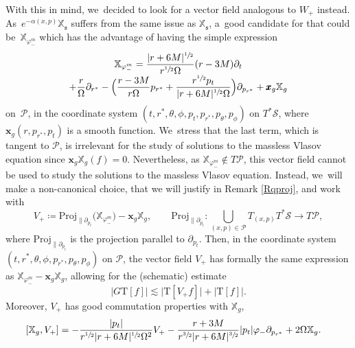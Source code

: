 \documentclass[10pt]{amsart}
\theoremstyle{plain}
\theoremstyle{definition}
\newcommand\T{{\mathbb{X}}}
\begin{document}
With this in mind, we~decided to look for a vector field analogous to $W_+$ instead. As~$e^{-\alpha (x,p)}\T_{\mathfrak{s}}$ suffers from the same issue as $\T_{\mathfrak{s}}$, a~good candidate for that could be~$\T_{\varphi_-^m}$ which has the advantage of having the simple expression\vspace*{-5pt}
\begin{multline}\label{eq:expTphi}
\T_{\varphi_-^m} = \frac{|r+6M|^{\sfrac{1}{2}}}{r^{\sfrac{1}{2}}\Omega}(r-3M) \partial_t\\[-3pt]
+\frac{r}{\Omega} \partial_{r^*}-\Bigl(\frac{r-3M}{r\Omega}p_{r^*}+\frac{r^{\sfrac{1}{2}}p_t}{|r+6M|^{\sfrac{1}{2}} \Omega} \Bigr) \partial_{p_{r^*}}+\pmb{x}_g \T_g
\end{multline}
on \,$\mathcal{P}$, in the coordinate system $(t,r^*,\theta, \phi, p_t,p_{r^*},p_\theta, p_\phi)$ on $T^* \mathcal{S}$, where $\pmb{x}_g(r,p_{r^*},p_t)$ is a smooth function. We~stress that the last term, which is tangent to $\mathcal{P}$, is irrelevant for the study of solutions to the massless Vlasov equation since $\pmb{x}_g \T_g(f)=0$. Nevertheless, as $\T_{\varphi_-^m} \notin T \mathcal{P}$, this vector field cannot be used to study the solutions to the massless Vlasov equation. Instead, we~will make a non-canonical choice, that we will justify in Remark \ref{Rqproj}, and work with\vspace*{-3pt}
\[
V_+ \coloneqq \mathrm{Proj}_{\parallel \partial_{p_t}}\bigl(\T_{\varphi_-^m} \bigr)-\pmb{x}_g \T_g,\qquad \mathrm{Proj}_{\parallel \partial_{p_t}} : \bigcup_{(x,p) \in \mathcal{P}} T_{(x,p)} T^* \mathcal{S} \to T \mathcal{P},
\]
where $\mathrm{Proj}_{\parallel \partial_{p_t}} $ is the projection parallel to $\partial_{p_t}$. Then, in the coordinate system $(t,r^*,\theta, \phi,p_{r^*},p_\theta, p_\phi)$ on $\mathcal{P}$, the vector field $V_+$ has formally the same expression as $\T_{\varphi_-^m}-\pmb{x}_g \T_g$, allowing for the (schematic) estimate\vspace*{-3pt}
\begin{equation}\label{eq:Gderiv}
\big| G \mathrm{T}[f] \big| \lesssim \big|\mathrm{T}[V_+ f]\big|+\big|\mathrm{T}[f] \big|.
\end{equation}
Moreover, $V_+$ has good commutation properties with $\T_g$,
\begin{align}\label{eq:ComVplusinto}
[\T_g,V_+] &= - \frac{|p_t|}{r^{\sfrac{1}{2}}|r+6M|^{\sfrac{1}{2}}\Omega^2} V_+- \frac{r+3M}{r^{\sfrac{3}{2}}|r+6M|^{\sfrac{3}{2}}}|p_t|\varphi_- \partial_{p_{r^*}} + 2\Omega \T_g.
\end{align}
\end{document}
